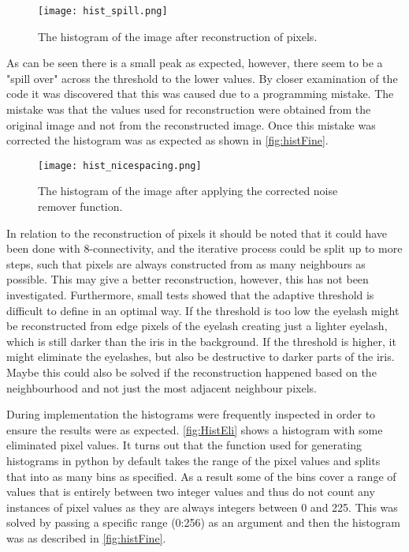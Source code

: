 \begin{figure}[h]
	\centering
	\texttt{[image: hist\_spill.png]}
	\caption{The histogram of the image after reconstruction of pixels.}
	\label{fig:histSpill}
\end{figure}

As can be seen there is a small peak as expected, however, there seem to be a "spill over" across the threshold to the lower values. By closer examination of the code it was discovered that this was caused due to a programming mistake. The mistake was that the values used for reconstruction were obtained from the original image and not from the reconstructed image. Once this mistake was corrected the histogram was as expected as shown in \autoref{fig:histFine}. 

\begin{figure}[h]
	\centering
	\texttt{[image: hist\_nicespacing.png]}
	\caption{The histogram of the image after applying the corrected noise remover function.}
	\label{fig:histFine}
\end{figure}

In relation to the reconstruction of pixels it should be noted that it could have been done with 8-connectivity, and the iterative process could be split up to more steps, such that pixels are always constructed from as many neighbours as possible. This may give a better reconstruction, however, this has not been investigated. 
Furthermore, small tests showed that the adaptive threshold is difficult to define in an optimal way. If the threshold is too low the eyelash might be reconstructed from edge pixels of the eyelash creating just a lighter eyelash, which is still darker than the iris in the background. If the threshold is higher, it might eliminate the eyelashes, but also be destructive to darker parts of the iris. Maybe this could also be solved if the reconstruction happened based on the neighbourhood and not just the most adjacent neighbour pixels.
 
During implementation the histograms were frequently inspected in order to ensure the results were as expected. \autoref{fig:HistEli} shows a histogram with some eliminated pixel values. It turns out that the function used for generating histograms in python by default takes the range of the pixel values and splits that into as many bins as specified. As a result some of the bins cover a range of values that is entirely between two integer values and thus do not count any instances of pixel values as they are always integers between 0 and 225. This was solved by passing a specific range (0:256) as an argument and then the histogram was as described in \autoref{fig:histFine}.

